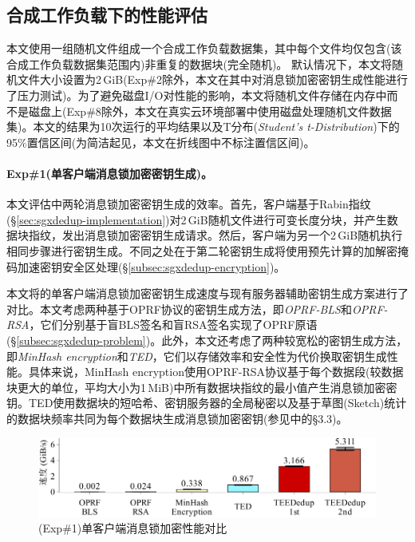 \subsection{合成工作负载下的性能评估}
\label{subsec:sgxdedup-synthetic}

本文使用一组随机文件组成一个合成工作负载数据集，其中每个文件均仅包含(该合成工作负载数据集范围内)非重复的数据块(完全随机)。 默认情况下，本文将随机文件大小设置为2\,GiB(Exp\#2除外，本文在其中对消息锁加密密钥生成性能进行了压力测试)。为了避免磁盘I/O对性能的影响，本文将随机文件存储在内存中而不是磁盘上(Exp\#8除外，本文在真实云环境部署中使用磁盘处理随机文件数据集)。本文的结果为10次运行的平均结果以及T分布(\textit{Student's t-Distribution})下的95\%置信区间(为简洁起见，本文在折线图中不标注置信区间)。

\paragraph*{Exp\#1(单客户端消息锁加密密钥生成)。}本文评估\sysnameS 中两轮消息锁加密密钥生成的效率。首先，客户端基于Rabin指纹(\S\ref{sec:sgxdedup-implementation})对2\,GiB随机文件进行可变长度分块，并产生数据块指纹，发出消息锁加密密钥生成请求。然后，客户端为另一个2\,GiB随机执行相同步骤进行密钥生成。不同之处在于第二轮密钥生成将使用预先计算的加解密掩码加速密钥安全区处理(\S\ref{subsec:sgxdedup-encryption})。

本文将\sysnameS 的单客户端消息锁加密密钥生成速度与现有服务器辅助密钥生成方案进行了对比。本文考虑两种基于OPRF协议的密钥生成方法，即\textit{OPRF-BLS}和\textit{OPRF-RSA}，它们分别基于盲BLS签名和盲RSA签名实现了OPRF原语(\S\ref{subsec:sgxdedup-problem})。此外，本文还考虑了两种较宽松的密钥生成方法，即\textit{MinHash encryption}和\textit{TED}，它们以存储效率和安全性为代价换取密钥生成性能。具体来说，MinHash encryption使用OPRF-RSA协议基于每个数据段(较数据块更大的单位，平均大小为1\,MiB)中所有数据块指纹的最小值产生消息锁加密密钥。TED使用数据块的短哈希、密钥服务器的全局秘密以及基于草图(Sketch)统计的数据块频率共同为每个数据块生成消息锁加密密钥(参见中的\S3.3)。

\begin{figure}[!htb]
  \centering
  \includegraphics[width=\textwidth]{pic/sgxdedup/plot/exp_a2/expa2_keyGenPerformance.pdf}
  \caption{(Exp\#1)单客户端消息锁加密性能对比}
  \label{fig:sgxdedup-keygen-comparison}
\end{figure}

